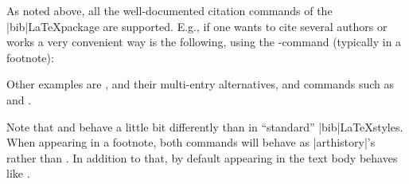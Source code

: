 \documentclass[a4paper,
10pt,
ngerman,
english
]{ltxdoc}
\begin{document}
As noted above, all the well-documented citation commands of the |bib|\LaTeX package are supported.
\DescribeMacro{\cites}
E.g., if one wants to cite several authors or works a very convenient way is the following, using the -command (typically in a footnote):
Other examples are , and their multi-entry alternatives, and commands such as  and .

Note that  and  behave a little bit differently than in \enquote{standard} |bib|\LaTeX styles. When appearing in a footnote, both commands will behave as |arthistory|'s  rather than . In addition to that, by default  appearing in the text body behaves like .
\end{document}
